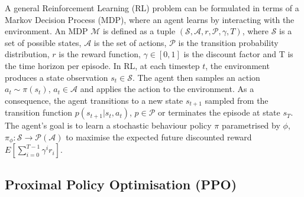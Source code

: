 \documentclass[letterpaper, 10 pt, conference]{ieeeconf}
\begin{document}
A general Reinforcement Learning (RL) problem can be formulated in terms of a Markov Decision Process (MDP), where an agent learns by interacting with the environment. An MDP $\mathcal{M}$ is defined as a tuple $(\mathcal{S}, \mathcal{A}, r, \mathcal{P}, \gamma, T) $, where $\mathcal{S}$ is a set of possible states, $\mathcal{A}$ is the set of actions, $\mathcal{P}$ is the transition probability distribution, $r$ is the reward function, $\gamma \in [0, 1]$ is the discount factor and T is the time horizon per episode. In RL, at each timestep $t$, the environment produces a state observation $s_{t} \in \mathcal{S}$. The agent then samples an action $a_t \sim \pi(s_t)$, $a_t \in \mathcal{A}$ and applies the action to the environment. As a consequence, the agent transitions to a new state $s_{t+1}$ sampled from the transition function $p(s_{t+1} | s_{t}, a_{t})$, $p \in \mathcal{P}$ or terminates the episode at state $s_{T}$. The agent's goal is to learn a stochastic behaviour policy $\pi$ parametrised by $\phi$, $\pi_\phi: \mathcal{S} \rightarrow \mathcal{P}(\mathcal{A})$ to maximise the expected future discounted reward $E[\sum_{i=0}^{T-1} \gamma^{i} r_i]$.


\subsection{Proximal Policy Optimisation (PPO) \label{sec:PPO}}
\end{document}
